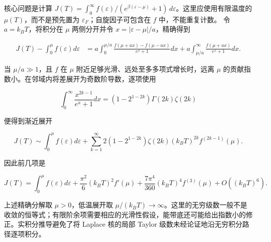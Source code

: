 核心问题是计算 $J(T)=\int_0^\infty f(\varepsilon)/(e^{\beta(\varepsilon-\mu)}+1)\,d\varepsilon$。这里应使用有限温度的 $\mu(T)$，而不是预先置为 $\varepsilon_F$；自旋因子可包含在 $f$ 中，不能重复计数。
令 $a=k_BT$，将积分在 $\mu$ 两侧分开并令 $x=|\varepsilon-\mu|/a$，精确得到
\begin{linenomath}\begin{align}
 J(T)-\int_0^\mu f(\varepsilon)d\varepsilon
 &=a\int_0^{\mu/a}\frac{f(\mu+ax)-f(\mu-ax)}{e^x+1}dx
   +a\int_{\mu/a}^\infty\frac{f(\mu+ax)}{e^x+1}dx.
\end{align}\end{linenomath}
当 $\mu/a\gg1$，且 $f$ 在 $\mu$ 附近足够光滑、远处至多多项式增长时，远离 $\mu$ 的贡献指数小。在邻域内将差展开为奇数阶导数，逐项使用
\begin{linenomath}\begin{equation}
 \int_0^\infty\frac{x^{2k-1}}{e^x+1}dx
 =(1-2^{1-2k})\Gamma(2k)\zeta(2k)
\end{equation}\end{linenomath}
便得到渐近展开
\begin{linenomath}\begin{equation}
 J(T)\sim\int_0^\mu f(\varepsilon)d\varepsilon+
 \sum_{k=1}^\infty 2(1-2^{1-2k})\zeta(2k)(k_BT)^{2k}f^{(2k-1)}(\mu).
\end{equation}\end{linenomath}
因此前几项是
\begin{linenomath}\begin{equation}
 J(T)=\int_0^\mu f(\varepsilon)d\varepsilon+
 \frac{\pi^2}{6}(k_BT)^2f'(\mu)+\frac{7\pi^4}{360}(k_BT)^4f^{(3)}(\mu)+O((k_BT)^6).
\end{equation}\end{linenomath}
上述精确分解取 $\mu>0$，低温展开取 $\mu/(k_BT)\to\infty$。这里的无穷级数一般不是收敛的恒等式；有限阶余项需要相应的光滑性假设，能带底还可能给出指数小的修正。实积分推导避免了将 Laplace 核的局部 Taylor 级数未经论证地沿无穷积分路径逐项积分。
